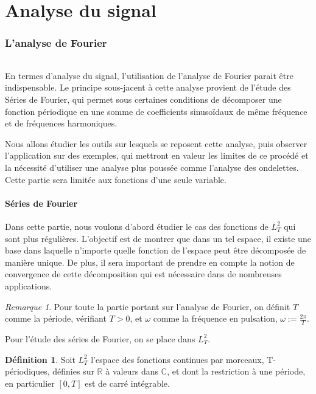 \documentclass[]{article}
\theoremstyle{remark}
\newtheorem{myrem}{Remarque}
\theoremstyle{definition}
\newtheorem{mydef}{Définition}
\begin{document}
	\part{Analyse du signal}
	\section{L'analyse de Fourier}

	\paragraph*{}
En termes d'analyse du signal, l'utilisation de l'analyse de Fourier parait être indispensable. Le principe sous-jacent à cette analyse provient de l'étude des Séries de Fourier, qui permet sous certaines conditions de décomposer une fonction périodique en une somme de coefficients sinusoïdaux de même fréquence et de fréquences harmoniques. 


Nous allons étudier les outils sur lesquels se reposent cette analyse, puis observer l'application sur des exemples, qui mettront en valeur les limites de ce procédé et la nécessité d'utiliser une analyse plus poussée comme l'analyse des ondelettes. Cette partie sera limitée aux fonctions d'une seule variable. 

	
	\subsection {Séries de Fourier}
	Dans cette partie, nous voulons d'abord étudier le cas des fonctions de $L_T^2$ qui sont plus régulières. L'objectif est de montrer que dans un tel espace, il existe une base dans laquelle n'importe quelle fonction de l'espace peut être décomposée de manière unique. De plus, il sera important de prendre en compte la notion de convergence de cette décomposition qui est nécessaire dans de nombreuses applications. 
	
	
			\begin{myrem}
				Pour toute la partie portant sur l'analyse de Fourier, on définit $T$ comme la période, vérifiant $T>0$, et $\omega$ comme la fréquence en pulsation, $\omega := \frac{2\pi}{T}$.
			\end{myrem}
			
				Pour l'étude des séries de Fourier, on se place dans $L^2_T$.
				
			\begin{mydef} 
			 Soit $L^2_T$ l'espace des fonctions continues par morceaux, T-périodiques, définies sur $\mathbb{R}$ à valeurs dans $\mathbb{C}$, et dont la restriction à une période, en particulier $[0,T]$ est de carré intégrable.
			\end{mydef}
			
\end{document}
